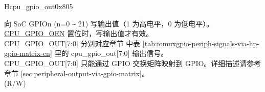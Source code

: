\begin{register}{H}{cpu\_gpio\_out}{0x805}\label{regdesc:GPIO_OUT}
%
%
%
%
%
%
%
%
%
\regnewline%
\begin{regdesc}\begin{reglist}
\label{fielddesc:GPIO_OUT}\item [CPU\_GPIO\_OUT] 向 SoC GPIOn (n=0 \verb+~+ 21) 写输出值（1 为高电平，0 为低电平）。\hyperref[fielddesc:GPIO_OEN]{CPU\_GPIO\_OEN} 置位时，写输出值才有效。\\
CPU\_GPIO\_OUT[7:0] 分别对应章节 \textit{} 中表 \ref{tab:iomuxgpio-periph-signals-via-hp-gpio-matrix-cn} 里的 cpu\_gpio\_out[7:0] 输出信号。\\
CPU\_GPIO\_OUT[7:0] 只能通过 GPIO 交换矩阵映射到 GPIO。详细描述请参考章节 \ref{sec:peripheral-output-via-gpio-matrix}。\\
(R/W)
\end{reglist}\end{regdesc}
\end{register}
